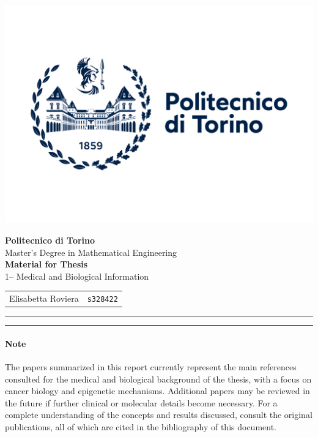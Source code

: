\documentclass[10pt]{extarticle}
\begin{document}
\noindent
\begin{minipage}{0.3\textwidth}
    \includegraphics[width=1.3\linewidth]{Figures/polito_logo_2021_blu.jpg}
\end{minipage}
\hfill
\begin{minipage}{0.68\textwidth}
    \raggedleft
    {\LARGE \textbf{Politecnico di Torino}}\\[0.2cm]
    {\large Master's Degree in Mathematical Engineering}\\[0.7cm]
    {\large \textbf{Material for Thesis}}\\[0.2cm]
    {\large 1-- Medical and Biological Information}\\[0.7cm]
    \begin{tabular}{rl}
        Elisabetta Roviera & \texttt{s328422} \\
    \end{tabular}
\end{minipage}

\vspace{1cm}
\hrule
\vspace{0.5cm}

\tableofcontents

\vspace{0.5cm}
\hrule
\vspace{1cm}


\justifying

\paragraph{Note} 
The papers summarized in this report currently represent the main references consulted for the medical and biological background of the thesis, with a focus on cancer biology and epigenetic mechanisms. Additional papers may be reviewed in the future if further clinical or molecular details become necessary. For a complete understanding of the concepts and results discussed, consult the original publications, all of which are cited in the bibliography of this document.
\end{document}
